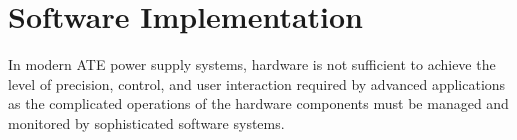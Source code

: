

\chapter{Software Implementation}
\label{ch:software-implementation}


In modern \ac{ATE} power supply systems, hardware is not sufficient to
achieve the level of precision, control, and user interaction required by
advanced applications as the complicated operations of the hardware components
must be managed and monitored by sophisticated software systems.







